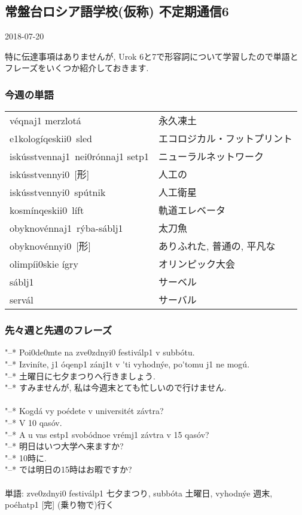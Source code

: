 \documentclass[11pt]{jsarticle}
\begin{document}
\subsection*{常盤台ロシア語学校(仮称) 不定期通信6}
\begin{flushright}
  2018-07-20
\end{flushright}
特に伝達事項はありませんが, Urok 6と7で形容詞について学習したので単語とフレーズをいくつか紹介しておきます.
\subsubsection*{今週の単語}
\begin{table}[ht]
  \begin{tabular}{ll}
    v\'eqna{j1} merzlot\'a & 永久凍土 \\
    {e1}kolog\'iqeski{i0}\ sled & エコロジカル・フットプリント \\
    isk\'usstvenna{j1}\ ne{i0}r\'onna{j1} set{p1} & ニューラルネットワーク \\
    isk\'usstvenny{i0}\ [形] & 人工の \\
    isk\'usstvenny{i0}\ sp\'utnik & 人工衛星 \\
    kosm\'inqeski{i0}\ l\'ift & 軌道エレベータ \\
    obyknov\'enna{j1}\ r\'yba-s\'abl{j1} & 太刀魚 \\
    obyknov\'enny{i0}\ [形] & ありふれた, 普通の, 平凡な \\
    olimp\'i{i0}skie \'igry & オリンピック大会 \\
    s\'abl{j1} & サーベル \\
    serv\'al & サーバル
  \end{tabular}
\end{table}
\subsubsection*{先々週と先週のフレーズ}
\noindent
"--* Po{i0}d{e0}mte na zv{e0}zdny{i0} festiv\'al{p1} v subb\'otu. \\
"--* Izvin\'ite, {j1} \'oqen{p1} z\'an{j1}t v \'\cyrerev ti vyhodn\'ye, po\'\cyrerev tomu {j1} ne mog\'u. \\
"--* 土曜日に七夕まつりへ行きましょう.\\
"--* すみませんが, 私は今週末とても忙しいので行けません.\\
\\
"--* Kogd\'a vy po\'edete v universit\'et z\'avtra?\\
"--* V 10 qas\'ov.\\
"--* A u vas est{p1} svob\'odnoe vr\'em{j1} z\'avtra v 15 qas\'ov?\\
"--* 明日はいつ大学へ来ますか?\\
"--* 10時に.\\
"--* では明日の15時はお暇ですか?\\
\\
単語: zv{e0}zdny{i0} festiv\'al{p1} 七夕まつり, subb\'ota 土曜日, vyhodn\'ye 週末, po\'ehat{p1} [完] (乗り物で)行く
\end{document}

